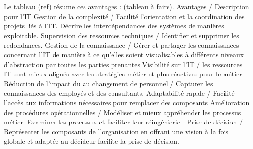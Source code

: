 %        
%        



Le tableau (ref) résume ces avantages \cite{shah2007frameworks} : 
(tableau à faire). 
Avantages / Description
pour l'IT
Gestion de la complexité / Facilité l'orientation et la coordination des projets 
liés à l'IT. Décrire les interdépendances des systèmes de manières exploitable.
Supervision des ressources techniques / Identifier et supprimer les redondances.
Gestion de la connaissance /  Gérer et partager les connaissances concernant 
l'IT de manière à ce qu'elles soient visualisables à différents niveaux 
d'abstraction par toutes les parties prenantes 
Visibilité sur l'IT / les ressources IT sont mieux alignés avec les stratégies 
métier et plus réactives pour le métier 
Réduction de l'impact du au changement de personnel / Capturer les connaissances 
des employés et des consultants. 
Adaptabilité rapide /  Facilité l'accès aux informations nécessaires pour 
remplacer des composants
Amélioration des procédures opérationnelles / Modéliser et mieux appréhender les 
processus métier. Examiner les processus et faciliter leur réingénierie  .
Prise de décision / Représenter les composants de l'organisation  en offrant une 
vision à la fois globale et adaptée au décideur facilite la prise de décision.





